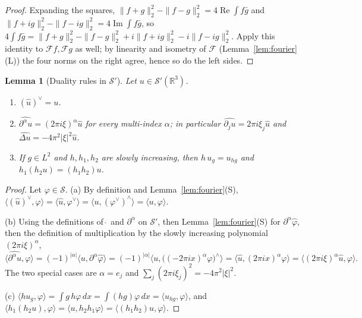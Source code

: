 \documentclass[11pt]{article}
\newtheorem{lemma}[theorem]{Lemma}
\theoremstyle{definition}
\theoremstyle{plain}
\newcommand{\R}{\mathbb R}
\begin{document}
\begin{proof}
Expanding the squares,
$\|f+g\|_2^2-\|f-g\|_2^2=4\operatorname{Re}\int f\bar g$ and
$\|f+ig\|_2^2-\|f-ig\|_2^2=4\operatorname{Im}\int f\bar g$, so
$4\int f\bar g=\|f+g\|_2^2-\|f-g\|_2^2+i\|f+ig\|_2^2-i\|f-ig\|_2^2$.
Apply this identity to $\mathcal Ff,\mathcal Fg$ as well; by linearity and
isometry of $\mathcal F$ (Lemma~\ref{lem:fourier}(L)) the four norms on the
right agree, hence so do the left sides.
\end{proof}

\begin{lemma}[Duality rules in $\mathcal S'$]\label{lem:sprime-rules}
Let $u\in\mathcal S'(\R^3)$.
\begin{enumerate}
\item[(a)] $(\hat u)^\vee=u$.
\item[(b)] $\widehat{\partial^\alpha u}=(2\pi i\xi)^\alpha\hat u$ for every
multi-index $\alpha$; in particular
$\widehat{\partial_ju}=2\pi i\xi_j\hat u$ and
$\widehat{\Delta u}=-4\pi^2|\xi|^2\hat u$.
\item[(c)] If $g\in L^2$ and $h,h_1,h_2$ are slowly increasing, then
$h\,u_g=u_{hg}$ and $h_1(h_2u)=(h_1h_2)u$.
\end{enumerate}
\end{lemma}

\begin{proof}
Let $\varphi\in\mathcal S$.  (a) By definition and
Lemma~\ref{lem:fourier}(S),
$\langle(\hat u)^\vee,\varphi\rangle=\langle\hat u,\varphi^\vee\rangle
=\langle u,(\varphi^\vee)^\wedge\rangle=\langle u,\varphi\rangle$.

(b) Using the definitions of $\widehat{\ }$ and $\partial^\alpha$ on
$\mathcal S'$, then Lemma~\ref{lem:fourier}(S) for
$\partial^\alpha\hat\varphi$, then the definition of multiplication by the
slowly increasing polynomial $(2\pi i\xi)^\alpha$,
\[
 \langle\widehat{\partial^\alpha u},\varphi\rangle
 =(-1)^{|\alpha|}\langle u,\partial^\alpha\hat\varphi\rangle
 =(-1)^{|\alpha|}\bigl\langle u,\bigl((-2\pi ix)^\alpha\varphi\bigr)^\wedge\bigr\rangle
 =\bigl\langle\hat u,(2\pi ix)^\alpha\varphi\bigr\rangle
 =\langle(2\pi i\xi)^\alpha\hat u,\varphi\rangle .
\]
The two special cases are $\alpha=e_j$ and
$\sum_j(2\pi i\xi_j)^2=-4\pi^2|\xi|^2$.

(c) $\langle hu_g,\varphi\rangle=\int g\,h\varphi\,dx=\int(hg)\varphi\,dx
=\langle u_{hg},\varphi\rangle$, and
$\langle h_1(h_2u),\varphi\rangle=\langle u,h_2h_1\varphi\rangle
=\langle(h_1h_2)u,\varphi\rangle$.
\end{proof}
\end{document}
